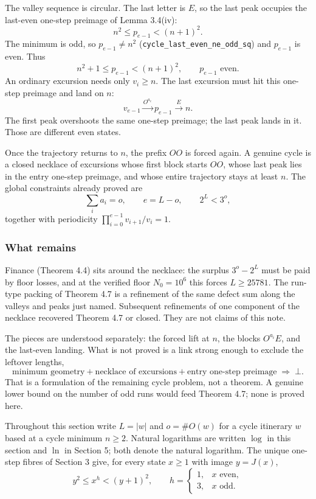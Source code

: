 \documentclass[12pt]{article}
\begin{document}
The valley sequence is circular. The last letter is \(E\), so the last
peak occupies the last-even one-step preimage of Lemma 3.4(iv): \[
n^2\le p_{e-1}<(n+1)^2.
\] The minimum is odd, so \(p_{e-1}\neq n^2\)
(\texttt{\nolinkurl{cycle_last_even_ne_odd_sq}}) and \(p_{e-1}\) is
even. Thus \[
n^2+1\le p_{e-1}<(n+1)^2,\qquad p_{e-1}\text{ even}.
\] An ordinary excursion needs only \(v_i\ge n\). The last excursion
must hit this one-step preimage and land on \(n\): \[
v_{e-1}
\overset{O^{a_e}}{\longrightarrow}
p_{e-1}
\overset{E}{\longrightarrow}
n.
\] The first peak overshoots the same one-step preimage; the last peak
lands in it. Those are different even states.

Once the trajectory returns to \(n\), the prefix \(OO\) is forced again.
A genuine cycle is a closed necklace of excursions whose first block
starts \(OO\), whose last peak lies in the entry one-step preimage, and
whose entire trajectory stays at least \(n\). The global constraints
already proved are \[
\sum_i a_i=o,\qquad e=L-o,\qquad 2^L<3^o,
\] together with periodicity \(\prod_{i=0}^{e-1} v_{i+1}/v_i=1\).

\subsubsection{What remains}\label{what-remains}

Finance (Theorem 4.4) sits around the necklace: the surplus \(3^o-2^L\)
must be paid by floor losses, and at the verified floor \(N_0=10^6\)
this forces \(L\ge 25781\). The run-type packing of Theorem 4.7 is a
refinement of the same defect sum along the valleys and peaks just
named. Subsequent refinements of one component of the necklace recovered
Theorem 4.7 or closed. They are not claims of this note.

The pieces are understood separately: the forced lift at \(n\), the
blocks \(O^{a_i}E\), and the last-even landing. What is not proved is a
link strong enough to exclude the leftover lengths, \[
\text{minimum geometry}
+\text{necklace of excursions}
+\text{entry one-step preimage}
\;\Rightarrow\;\bot.
\] That is a formulation of the remaining cycle problem, not a theorem.
A genuine lower bound on the number of odd runs would feed Theorem 4.7;
none is proved here.

Throughout this section write \(L=|w|\) and \(o=\#O(w)\) for a cycle
itinerary \(w\) based at a cycle minimum \(n\ge 2\). Natural logarithms
are written \(\log\) in this section and \(\ln\) in Section 5; both
denote the natural logarithm. The unique one-step fibres of Section 3
give, for every state \(x\ge 1\) with image \(y=J(x)\), \[
y^2\le x^h<(y+1)^2,
\qquad
h=\begin{cases}1,&x\text{ even},\\3,&x\text{ odd}.\end{cases}
\]
\end{document}
